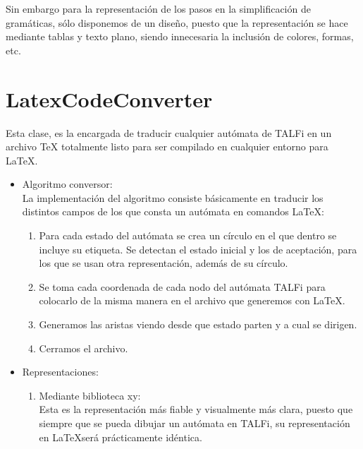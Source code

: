 \documentclass[12pt,a4paper,spanish]{book}
\begin{document}
Sin embargo para la representaci\'on de los pasos en la simplificaci\'on de gram\'aticas, s\'olo disponemos de un dise\~no, puesto que la representaci\'on se hace mediante tablas y texto plano, siendo innecesaria la inclusi\'on de colores, formas, etc.
\newpage
\section{LatexCodeConverter}
Esta clase, es la encargada de traducir cualquier aut\'omata de TALFi en un archivo \TeX{} totalmente listo para ser compilado en cualquier entorno para \LaTeX{}.
\newline
\begin{itemize}
\item Algoritmo conversor:\\
\newline
La implementaci\'on del algoritmo consiste b\'asicamente en traducir los distintos campos de los que consta un aut\'omata en comandos \LaTeX{}:
\begin{enumerate}
\item Para cada estado del aut\'omata se crea un c\'irculo en el que dentro se incluye su etiqueta. Se detectan el estado inicial y los de aceptaci\'on, para los que se usan otra representaci\'on, adem\'as de su c\'irculo.
\item Se toma cada coordenada de cada nodo del aut\'omata TALFi para colocarlo de la misma manera en el archivo que generemos con \LaTeX{}.
\item Generamos las aristas viendo desde que estado parten y a cual se dirigen.
\item Cerramos el archivo.\\
\end{enumerate}
\newpage
\item Representaciones:\\
\begin{enumerate}
\item Mediante biblioteca xy:\\
\newline
Esta es la representaci\'on m\'as fiable y visualmente m\'as clara, puesto que siempre que se pueda dibujar un aut\'omata en TALFi, su representaci\'on en \LaTeX ser\'a pr\'acticamente id\'entica.\\
\begin{center}

\end{center}
\end{enumerate}
\end{itemize}
\end{document}
